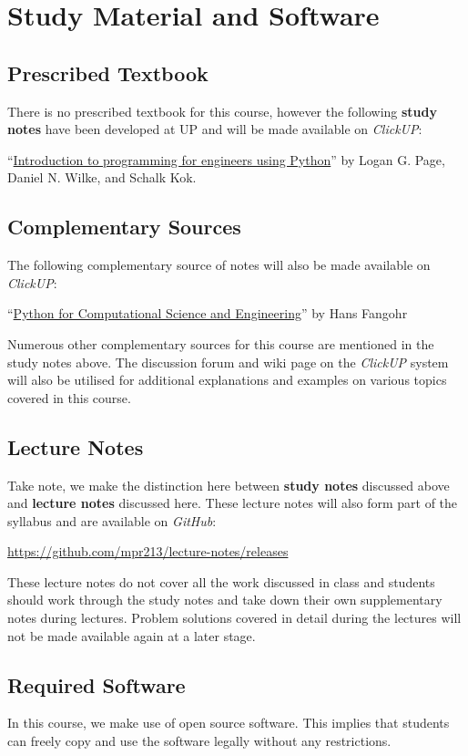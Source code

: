 \section{Study Material and Software}
    \subsection{Prescribed Textbook}
        There is no prescribed textbook for this course, however the following
        \textbf{study notes} have been developed at UP and will be made
        available on {\it ClickUP}:

        ``\underline{Introduction to programming for engineers using Python}''
        by Logan G. Page, Daniel N. Wilke, and Schalk Kok.

    \subsection{Complementary Sources}
        The following complementary source of notes will also be made available
        on {\it ClickUP}:

        ``\underline{Python for Computational Science and Engineering}'' by
        Hans Fangohr

        Numerous other complementary sources for this course are mentioned in
        the study notes above. The discussion forum and wiki page on the {\it
        ClickUP} system will also be utilised for additional explanations and
        examples on various topics covered in this course.

    \subsection{Lecture Notes}
        Take note, we make the distinction here between \textbf{study notes}
        discussed above and \textbf{lecture notes} discussed here. These
        lecture notes will also form part of the syllabus and are available on
        \textit{GitHub}:

        \url{https://github.com/mpr213/lecture-notes/releases}

        These lecture notes do not cover all the work discussed in class and
        students should work through the study notes and take down their own
        supplementary notes during lectures. Problem solutions covered in
        detail during the lectures will not be made available again at a later
        stage.

    \subsection{Required Software}
        In this course, we make use of open source software. This implies
        that students can freely copy and use the software legally
        without any restrictions.

